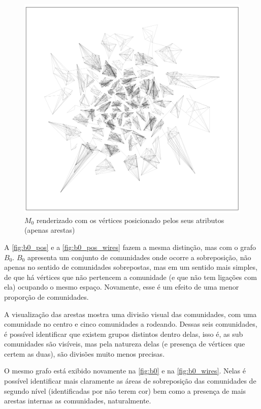 \documentclass[notes.tex]{subfiles}
\begin{document}
\begin{figure}[htpb]
    \centering
    \caption{$M_0$ renderizado com os vértices posicionado pelos seus atributos (apenas arestas)}\label{fig:m0_pos_wires}
    \includegraphics[width=\textwidth, height=0.52\textheight]{figures/m0_pos_wires.png}
     \end{figure}

A \autoref{fig:b0_pos} e a \autoref{fig:b0_pos_wires} fazem a mesma distinção, mas com o grafo $B_0$.
$B_0$ apresenta um conjunto de comunidades onde ocorre a sobreposição, não apenas no sentido de comunidades sobrepostas, mas em um sentido mais simples, de que há vértices que não pertencem a comunidade (e que não tem ligações com ela) ocupando o mesmo espaço.
Novamente, esse é um efeito de uma menor proporção de comunidades.

A visualização das arestas mostra uma divisão visual das comunidades, com uma comunidade no centro e cinco comunidades a rodeando.
Dessas seis comunidades, é possível identificar que existem grupos distintos dentro delas, isso é, as sub comunidades são visíveis, mas pela natureza delas (e presença de vértices que certem as duas), são divisões muito menos precisas.

O mesmo grafo está exibido novamente na \autoref{fig:b0} e na \autoref{fig:b0_wires}.
Nelas é possível identificar mais claramente as áreas de sobreposição das comunidades de segundo nível (identificadas por não terem cor) bem como a presença de mais arestas internas as comunidades, naturalmente.
\end{document}
